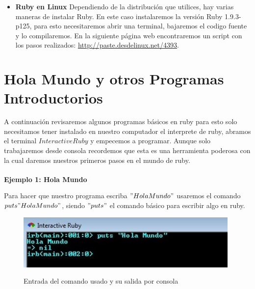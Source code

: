 \documentclass[11pt]{article} %
\begin{document}
\begin{itemize}
\item{\bf Ruby en Linux}
Dependiendo de la distribución que utilices, hay varias maneras de instalar Ruby. En este caso instalaremos la versión Ruby 1.9.3-p125, para esto necesitaremos abrir una terminal, bajaremos el codigo fuente y lo compilaremos.
En la siguiente página web encontraremos un script con los pasos realizados: \url {http://paste.desdelinux.net/4393}.

\end{itemize}


\section{\fontsize{14}{0} \bf Hola Mundo y otros Programas Introductorios}

A continuación revisaremos algunos programas básicos en ruby para esto solo necesitamos tener instalado en nuestro computador el interprete de ruby, abramos el terminal $ Interactive Ruby$  y empecemos a  programar. Aunque  solo trabajaremos desde consola  recordemos que esta es una herramienta poderosa con la cual daremos nuestros primeros pasos en el mundo de ruby.\\ \\


 {\fontsize{14}{0} \bf Ejemplo 1: Hola Mundo\\}

Para hacer que nuestro programa escriba $"Hola Mundo"$ usaremos el comando $puts  "Hola Mundo"$, siendo  $"puts"$ el comando básico para escribir algo en ruby. \\

\begin{figure}[h]
\centering
 \includegraphics[width=11cm]{./imagenes/Hola.jpg}\\
\caption{Entrada del comando usado y su salida por consola }\label{Fig:Hola}
\end{figure}
\end{document}
